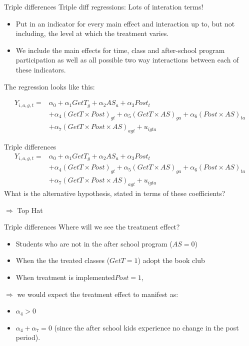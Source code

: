 \documentclass[
  ignorenonframetext,
]{beamer}
\begin{document}
\begin{frame}{Triple differences}
\protect\hypertarget{triple-differences}{}
Triple diff regressions: Lots of interation terms!

\begin{itemize}
\item
  Put in an indicator for every main effect and interaction up to, but
  not including, the level at which the treatment varies.
\item
  We include the main effects for time, class and after-school program
  participation as well as all possible two way interactions between
  each of these indicators.
\end{itemize}

The regression looks like this:

\[
\begin{aligned}
Y_{i,a,g,t}=&\alpha_0+\alpha_1 GetT_{g}+\alpha_2 AS_{a}+\alpha_3 Post_{t}\\
&+\alpha_4 (GetT \times Post)_{gt}+\alpha_5 (GetT \times AS)_{ga}+\alpha_6 (Post \times AS)_{ta}\\
&+\alpha_7 (GetT \times Post \times AS)_{agt}+u_{igta}
\end{aligned}
\]
\end{frame}

\begin{frame}{Triple differences}
\protect\hypertarget{triple-differences-1}{}
\[
\begin{aligned}
Y_{i,a,g,t}=&\alpha_0+\alpha_1 GetT_{g}+\alpha_2 AS_{a}+\alpha_3 Post_{t}\\
&+\alpha_4 (GetT \times Post)_{gt}+\alpha_5 (GetT \times AS)_{ga}+\alpha_6 (Post \times AS)_{ta}\\
&+\alpha_7 (GetT \times Post \times AS)_{agt}+u_{igta}
\end{aligned}
\] What is the alternative hypothesis, stated in terms of these
coefficients?

\(\Rightarrow\) Top Hat
\end{frame}

\begin{frame}{Triple differences}
\protect\hypertarget{triple-differences-2}{}
Where will we see the treatment effect?

\begin{itemize}
\item
  Students who are not in the after school program (\(AS=0\))
\item
  When the the treated classes (\(GetT=1\)) adopt the book club
\item
  When treatment is implemented\(Post=1\),
\end{itemize}

\(\Rightarrow\) we would expect the treatment effect to manifest as:

\begin{itemize}
\item
  \(\alpha_4>0\)
\item
  \(\alpha_4+\alpha_7=0\) (since the after school kids experience no
  change in the post period).
\end{itemize}
\end{frame}
\end{document}
